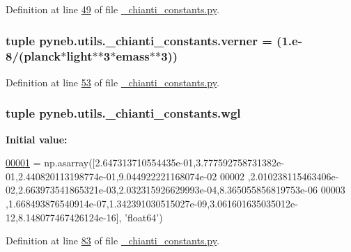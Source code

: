 Definition at line \hyperlink{__chianti__constants_8py_source_l00049}{49} of file \hyperlink{__chianti__constants_8py_source}{\-\_\-chianti\-\_\-constants.\-py}.

\hypertarget{namespacepyneb_1_1utils_1_1__chianti__constants_a8b5b3de48de538cfc793e5a020de12e3}{
\subsubsection[{verner}]{\setlength{\rightskip}{0pt plus 5cm}tuple pyneb.\-utils.\-\_\-chianti\-\_\-constants.\-verner = (1.e-\/8/({\bf planck}$\ast${\bf light}$\ast$$\ast$3$\ast${\bf emass}$\ast$$\ast$3))}}\label{namespacepyneb_1_1utils_1_1__chianti__constants_a8b5b3de48de538cfc793e5a020de12e3}


Definition at line \hyperlink{__chianti__constants_8py_source_l00053}{53} of file \hyperlink{__chianti__constants_8py_source}{\-\_\-chianti\-\_\-constants.\-py}.

\hypertarget{namespacepyneb_1_1utils_1_1__chianti__constants_a46ae7f1b894a2436d928f1280232b724}{
\subsubsection[{wgl}]{\setlength{\rightskip}{0pt plus 5cm}tuple pyneb.\-utils.\-\_\-chianti\-\_\-constants.\-wgl}}\label{namespacepyneb_1_1utils_1_1__chianti__constants_a46ae7f1b894a2436d928f1280232b724}
{\bfseries Initial value\-:}
\begin{DoxyCode}
\hypertarget{namespacepyneb_1_1utils_1_1__chianti__constants_l00001}{}\hyperlink{namespacepyneb_1_1utils_1_1__chianti__constants}{00001} = np.asarray([2.647313710554435e-01,3.777592758731382e-01,2.440820113198774e-01,9.044922221168074e-02
00002     ,2.010238115463406e-02,2.663973541865321e-03,2.032315926629993e-04,8.365055856819753e-06
00003     ,1.668493876540914e-07,1.342391030515027e-09,3.061601635035012e-12,8.148077467426124e-16], \textcolor{stringliteral}{'float64'})
\end{DoxyCode}


Definition at line \hyperlink{__chianti__constants_8py_source_l00083}{83} of file \hyperlink{__chianti__constants_8py_source}{\-\_\-chianti\-\_\-constants.\-py}.

